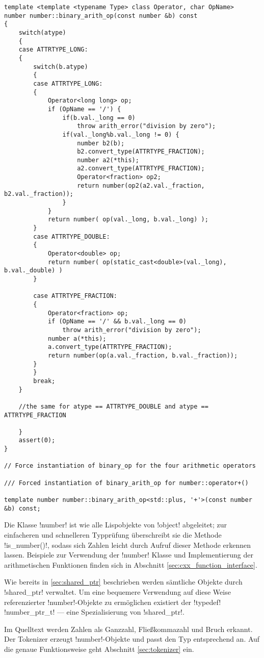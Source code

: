 \begin{lstlisting}[caption={Arithmetische Operatoren}, label=lst:op_template]
template <template <typename Type> class Operator, char OpName>
number number::binary_arith_op(const number &b) const
{
    switch(atype)
    {
    case ATTRTYPE_LONG:
    {
        switch(b.atype)
        {
        case ATTRTYPE_LONG:
        {
            Operator<long long> op;
            if (OpName == '/') {
                if(b.val._long == 0)
                    throw arith_error("division by zero");
                if(val._long%b.val._long != 0) {
                    number b2(b);
                    b2.convert_type(ATTRTYPE_FRACTION);
                    number a2(*this);
                    a2.convert_type(ATTRTYPE_FRACTION);
                    Operator<fraction> op2;
                    return number(op2(a2.val._fraction, b2.val._fraction));
                }
            }
            return number( op(val._long, b.val._long) );
        }
        case ATTRTYPE_DOUBLE:
        {
            Operator<double> op;
            return number( op(static_cast<double>(val._long), b.val._double) )
        }

        case ATTRTYPE_FRACTION:
        {
            Operator<fraction> op;
            if (OpName == '/' && b.val._long == 0)
                throw arith_error("division by zero");
            number a(*this);
            a.convert_type(ATTRTYPE_FRACTION);
            return number(op(a.val._fraction, b.val._fraction));
        }
        }
        break;
    }

    //the same for atype == ATTRTYPE_DOUBLE and atype == ATTRTYPE_FRACTION

    }
    assert(0);
}

// Force instantiation of binary_op for the four arithmetic operators

/// Forced instantiation of binary_arith_op for number::operator+()

template number number::binary_arith_op<std::plus, '+'>(const number &b) const;
\end{lstlisting}

Die Klasse !number! ist wie alle Lispobjekte von !object! abgeleitet; zur einfacheren und schnelleren Typprüfung überschreibt sie die Methode !is_number()!, sodass sich Zahlen leicht durch Aufruf dieser Methode erkennen lassen. Beispiele zur Verwendung der !number! Klasse und Implementierung der arithmetischen Funktionen finden sich in Abschnitt \ref{sec:cxx_function_interface}.

Wie bereits in \ref{sec:shared_ptr} beschrieben werden sämtliche Objekte durch !shared_ptr! verwaltet. Um eine bequemere Verwendung auf diese Weise referenzierter !number!-Objekte zu ermöglichen existiert der !typedef! !number_ptr_t! --- eine Spezialisierung von !shared_ptr!.

Im Quelltext werden Zahlen als Ganzzahl, Fließkommazahl und Bruch erkannt. Der Tokenizer erzeugt !number!-Objekte und passt den Typ entsprechend an. Auf die genaue Funktionsweise geht Abschnitt \ref{sec:tokenizer} ein.